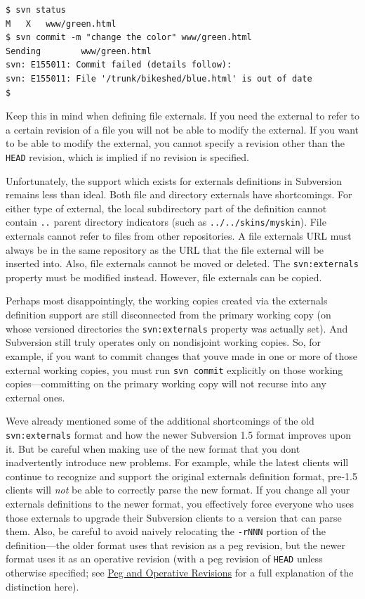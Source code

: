 \begin{verbatim}
$ svn status
M   X   www/green.html
$ svn commit -m "change the color" www/green.html
Sending        www/green.html
svn: E155011: Commit failed (details follow):
svn: E155011: File '/trunk/bikeshed/blue.html' is out of date
$
\end{verbatim}

Keep this in mind when defining file externals. If you need the external
to refer to a certain revision of a file you will not be able to modify
the external. If you want to be able to modify the external, you cannot
specify a revision other than the \texttt{HEAD} revision, which is
implied if no revision is specified.

Unfortunately, the support which exists for externals definitions in
Subversion remains less than ideal. Both file and directory externals
have shortcomings. For either type of external, the local subdirectory
part of the definition cannot contain \texttt{..} parent directory
indicators (such as \texttt{../../skins/myskin}). File externals cannot
refer to files from other repositories. A file
external\textquotesingle s URL must always be in the same repository as
the URL that the file external will be inserted into. Also, file
externals cannot be moved or deleted. The \texttt{svn:externals}
property must be modified instead. However, file externals can be
copied.

Perhaps most disappointingly, the working copies created via the
externals definition support are still disconnected from the primary
working copy (on whose versioned directories the \texttt{svn:externals}
property was actually set). And Subversion still truly operates only on
nondisjoint working copies. So, for example, if you want to commit
changes that you\textquotesingle ve made in one or more of those
external working copies, you must run \texttt{svn\ commit} explicitly on
those working copies---committing on the primary working copy will not
recurse into any external ones.

We\textquotesingle ve already mentioned some of the additional
shortcomings of the old \texttt{svn:externals} format and how the newer
Subversion 1.5 format improves upon it. But be careful when making use
of the new format that you don\textquotesingle t inadvertently introduce
new problems. For example, while the latest clients will continue to
recognize and support the original externals definition format, pre-1.5
clients will \emph{not} be able to correctly parse the new format. If
you change all your externals definitions to the newer format, you
effectively force everyone who uses those externals to upgrade their
Subversion clients to a version that can parse them. Also, be careful to
avoid naively relocating the \texttt{-rNNN} portion of the
definition---the older format uses that revision as a peg revision, but
the newer format uses it as an operative revision (with a peg revision
of \texttt{HEAD} unless otherwise specified; see
\hyperref[svn.advanced.pegrevs]{Peg and Operative Revisions} for a full
explanation of the distinction here).

